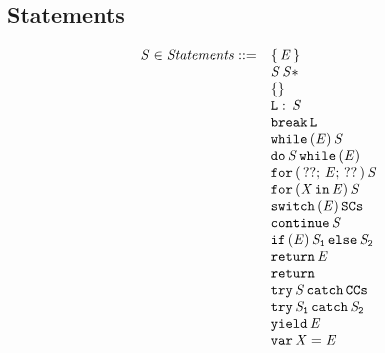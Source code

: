 \documentclass{article}
\begin{document}
\subsection{Statements}
\label{subsec:stmt-syntax}
%
\newcommand{\ExpressionStatement}[1]{\{\, #1\, \}}
\newcommand{\Block}[1]{#1\, \statementmeta*}
\newcommand{\EmptyStatement}{\{\}}
%
%
\newcommand{\LabeledStatement}[2]{#1:\, #2}
\newcommand{\BreakStatement}[1]{\tt{break}\, #1}
\newcommand{\WhileStatement}[2]{\tt{while}\, (#1)\, #2}
\newcommand{\DoStatement}[2]{\tt{do}\, #1\, \tt{while}\, (#2)}
\newcommand{\ForStatement}[4]{\tt{for}\, (\,#1;\, #2;\, #3\,)\, #4}
\newcommand{\ForInStatement}[3]{\tt{for}\,(#1\,\tt{in}\,#2)\,#3}
%
\newcommand{\SwitchStatement}[2]{\tt{switch}\,(#1)\,#2}
\newcommand{\ContinueSwitchStatement}[1]{\tt{continue}\,#1}
\newcommand{\IfStatement}[3]{\tt{if}\,(#1)\,#2\,\tt{else}\,#3}
\newcommand{\ReturnStatement}[1]{\tt{return}\,#1}
%
\newcommand{\TryCatch}[2]{\tt{try}\,#1\,\tt{catch}\,#2}
\newcommand{\TryFinally}[2]{\tt{try}\,#1\,\tt{catch}\,#2}
%
\newcommand{\Yield}[1]{\tt{yield}\,#1}
%
\newcommand{\VarDeclaration}[2]{\tt{var}\,#1=#2}
%
%
\[
\begin{array}{rl}

  \statementmeta \in \mathit{Statements} ::=
  & \ExpressionStatement{\expressionmeta} \\
  & \Block{\statementmeta} \\
  & \EmptyStatement \\
  & \LabeledStatement{\labelmeta}{\statementmeta} \\
  & \BreakStatement{\labelmeta} \\
  & \WhileStatement{\expressionmeta}{\statementmeta} \\
  & \DoStatement{\statementmeta}{\expressionmeta} \\
  & \ForStatement{??}{\expressionmeta}{??}{\statementmeta} \\
  & \ForInStatement{\idmeta}{\expressionmeta}{\statementmeta} \\
  & \SwitchStatement{\expressionmeta}{\tt{SCs}} \\
  & \ContinueSwitchStatement{\statementmeta} \\
  & \IfStatement{\expressionmeta}{\statementmeta_1}{\statementmeta_2} \\
  & \ReturnStatement{\expressionmeta} \\
  & \ReturnStatement{} \\
  & \TryCatch{\statementmeta}{\tt{CCs}} \\
  & \TryFinally{\statementmeta_1}{\statementmeta_2} \\
  & \Yield{\expressionmeta} \\
  & \VarDeclaration{\idmeta}{\expressionmeta} \\

\end{array}
\]
\end{document}

